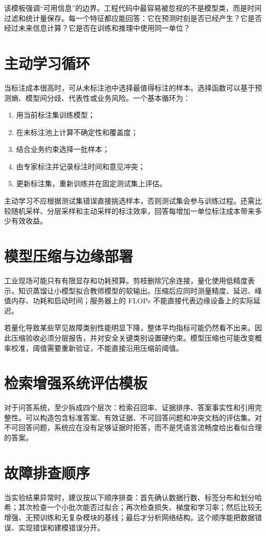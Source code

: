 该模板强调“可用信息”的边界。工程代码中最容易被忽视的不是模型类，而是时间过滤和统计量保存。每一个特征都应能回答：它在预测时刻是否已经产生？它是否经过未来信息计算？它是否在训练和推理中使用同一单位？

\section{主动学习循环}
当标注成本很高时，可从未标注池中选择最值得标注的样本。选择函数可以基于预测熵、模型间分歧、代表性或业务风险。一个基本循环为：
\begin{enumerate}[label=\arabic*.]
 \item 用当前标注集训练模型；
 \item 在未标注池上计算不确定性和覆盖度；
 \item 结合业务约束选择一批样本；
 \item 由专家标注并记录标注时间和意见冲突；
 \item 更新标注集，重新训练并在固定测试集上评估。
\end{enumerate}
主动学习不应根据测试集错误直接挑选样本，否则测试集会参与训练过程。还需比较随机采样、分层采样和主动采样的标注效率，回答每增加一单位标注成本带来多少有效收益。

\section{模型压缩与边缘部署}
工业现场可能只有有限显存和功耗预算。剪枝删除冗余连接，量化使用低精度表示，知识蒸馏让小模型拟合教师模型的软输出。压缩后应同时测量精度、延迟、峰值内存、功耗和启动时间；服务器上的 FLOPs 不能直接代表边缘设备上的实际延迟。

若量化导致某些罕见故障类别性能明显下降，整体平均指标可能仍然看不出来。因此压缩验收必须分层报告，并对安全关键类别设置硬约束。模型压缩也可能改变概率校准，阈值需要重新验证，不能直接沿用压缩前阈值。

\section{检索增强系统评估模板}
对于问答系统，至少拆成四个层次：检索召回率、证据排序、答案事实性和引用完整性。可以构造包含标准答案、有效证据、不可回答问题和冲突文档的评估集。对不可回答问题，系统应在没有足够证据时拒答，而不是凭语言流畅度给出看似合理的答案。

\section{故障排查顺序}
当实验结果异常时，建议按以下顺序排查：首先确认数据行数、标签分布和划分哈希；其次检查一个小批次能否过拟合；再次检查损失、梯度和学习率；然后比较无增强、无预训练和无复杂模块的基线；最后才分析网络结构。这个顺序能把数据错误、实现错误和建模错误分开。

